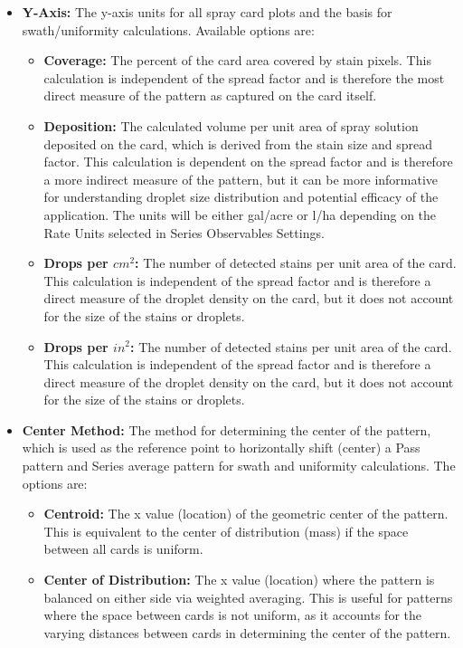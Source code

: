 \documentclass[10pt,letterpaper,titlepage]{article}
\begin{document}
    \begin{itemize}
        \item \textbf{Y-Axis:} The y-axis units for all spray card plots and the basis for swath/uniformity calculations. Available options are:
        \begin{itemize}
            \item \textbf{Coverage:} The percent of the card area covered by stain pixels. This calculation is independent of the spread factor and is therefore the most direct measure of the pattern as captured on the card itself.
            \item \textbf{Deposition:} The calculated volume per unit area of spray solution deposited on the card, which is derived from the stain size and spread factor. This calculation is dependent on the spread factor and is therefore a more indirect measure of the pattern, but it can be more informative for understanding droplet size distribution and potential efficacy of the application. The units will be either gal/acre or l/ha depending on the Rate Units selected in Series Observables Settings.
            \item \textbf{Drops per $cm^2$:} The number of detected stains per unit area of the card. This calculation is independent of the spread factor and is therefore a direct measure of the droplet density on the card, but it does not account for the size of the stains or droplets.
            \item \textbf{Drops per $in^2$:} The number of detected stains per unit area of the card. This calculation is independent of the spread factor and is therefore a direct measure of the droplet density on the card, but it does not account for the size of the stains or droplets.
        \end{itemize}
        \item \textbf{Center Method:} The method for determining the center of the pattern, which is used as the reference point to horizontally shift (center) a Pass pattern and Series average pattern for swath and uniformity calculations. The options are:
        \begin{itemize}
            \item \textbf{Centroid:} The x value (location) of the geometric center of the pattern. This is equivalent to the center of distribution (mass) if the space between all cards is uniform.
            \item \textbf{Center of Distribution:} The x value (location) where the pattern is balanced on either side via weighted averaging. This is useful for patterns where the space between cards is not uniform, as it accounts for the varying distances between cards in determining the center of the pattern.
        \end{itemize}
    \end{itemize}
\end{document}
